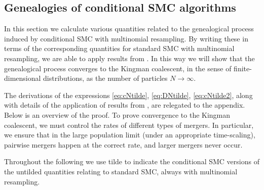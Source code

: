 \documentclass[fleqn]{article}
\theoremstyle{definition}
\begin{document}
\subsection{Genealogies of conditional SMC algorithms}\label{sec:condSMC_maths}
In this section we calculate various quantities related to the genealogical process induced by conditional SMC with multinomial resampling. By writing these in terms of the corresponding quantities for standard SMC with multinomial resampling, we are able to apply results from \citet{koskela2018}. In this way we will show that the genealogical process converges to the Kingman coalescent, in the sense of finite-dimensional distributions, as the number of particles $N\to\infty$.

The derivations of the expressions \eqref{eq:cNtilde}, \eqref{eq:DNtilde}, \eqref{eq:cNtilde2}, along with details of the application of results from \citet{koskela2018}, are relegated to the appendix. Below is an overview of the proof.
To prove convergence to the Kingman coalescent, we must control the rates of different types of mergers. In particular, we ensure that in the large population limit (under an appropriate time-scaling), pairwise mergers happen at the correct rate, and larger mergers never occur.

Throughout the following we use tilde to indicate the conditional SMC versions of the untilded quantities relating to standard SMC, always with multinomial resampling.
\end{document}
